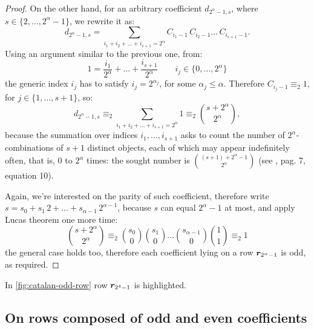 \begin{proof}
    On the other hand, for an arbitrary coefficient $d_{2^{\alpha}-1,s}$, where
    $s\in\lbrace{2,\ldots,2^{\alpha}-1}\rbrace$, we rewrite it as:
    \begin{displaymath}
        d_{2^{\alpha}-1,s} = \sum_{i_{1}+i_{2}+\ldots+i_{s+1}=2^{\alpha}}
            {C_{i_{1}-1}\,C_{i_{2}-1}\ldots\,C_{i_{s+1}-1}}.
    \end{displaymath}
    Using an argument similar to the previous one, from:
    \begin{displaymath}
        1 = \frac{i_{1}}{2^{\alpha}}+\ldots+\frac{i_{s+1}}{2^{\alpha}} \qquad 
            i_{j}\in\lbrace 0,\ldots,2^{\alpha}\rbrace
    \end{displaymath} 
    the generic index $i_{j}$ has to satisfy $i_{j}=2^{\alpha_{j}}$, for some
    $\alpha_{j}\leq\alpha$. Therefore $C_{i_{j}-1}\equiv_{2}1$,
    for $j\in\lbrace1,\ldots,s+1\rbrace$, so:
    \begin{displaymath}
        d_{2^{\alpha}-1,s} \equiv_{2} \sum_{i_{1}+i_{2}+\ldots+i_{s+1}=2^{\alpha}}{1}
            \equiv_{2} {{s+2^{\alpha}}\choose{2^{\alpha}}},
    \end{displaymath}
    because the summation over indices $i_{1},\ldots,i_{s+1}$ asks to count the
    number of $2^{\alpha}$-combinations of $s+1$ distinct objects, each of
    which may appear indefinitely often, that is, $0$ to $2^{\alpha}$ times:
    the sought number is ${{(s+1)+2^{\alpha}-1}\choose{2^{\alpha}}}$
    (see \cite{riordan:intro:combinatorial:analysis}, pag. 7, equation 10).

    Again, we're interested on the parity of such coefficient, therefore
    write $s=s_{0}+s_{1}\,2+\ldots+s_{\alpha-1}\,2^{\alpha-1}$, because $s$ can equal 
    $2^{\alpha}-1$ at most, and apply Lucas theorem one more time:
    \begin{displaymath}
        {{s+2^{\alpha}}\choose{2^{\alpha}}}\equiv_{2} 
            {{s_{0}}\choose{0}}{{s_{1}}\choose{0}} \ldots
                {{s_{\alpha-1}}\choose{0}}{{1}\choose{1}}\equiv_{2}1 
    \end{displaymath}
    the general case holds too, therefore each coefficient lying on
    a row $\boldsymbol{r}_{2^{\alpha}-1}$ is odd, as required.
\end{proof}


In \autoref{fig:catalan-odd-row} row $\boldsymbol{r}_{2^{4}-1}$ is highlighted.

\subsection{On rows composed of odd and even coefficients}


